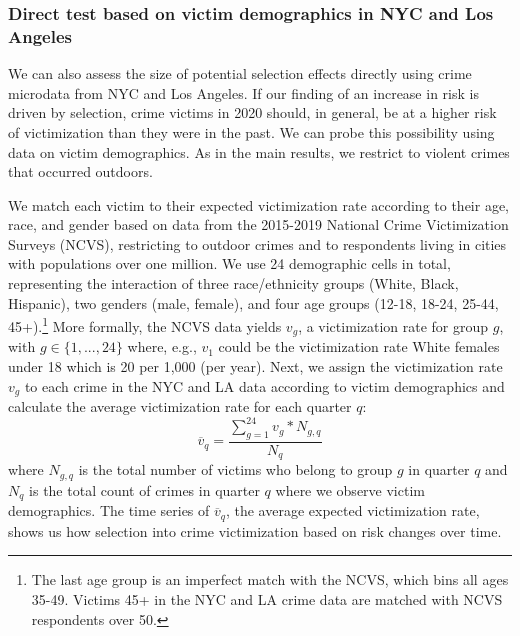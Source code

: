 \newpage 
\subsubsection{Direct test based on victim demographics in NYC and Los Angeles} \label{selection2}


We can also assess the size of potential selection effects directly using crime microdata from NYC and Los Angeles. If our finding of an increase in risk is driven by selection, crime victims in 2020 should, in general, be at a higher risk of victimization than they were in the past. We can probe this possibility using data on victim demographics. As in the main results, we restrict to violent crimes that occurred outdoors.

We match each victim to their expected victimization rate according to their age, race, and gender based on data from the 2015-2019 National Crime Victimization Surveys (NCVS), restricting to outdoor crimes and to respondents living in cities with populations over one million. We use 24 demographic cells in total, representing the interaction of three race/ethnicity groups (White, Black, Hispanic), two genders (male, female), and four age groups (12-18, 18-24, 25-44, 45+).\footnote{The last age group is an imperfect match with the NCVS, which bins all ages 35-49. Victims 45+ in the NYC and LA crime data are matched with NCVS respondents over 50.} More formally, the NCVS data yields $v_g$, a victimization rate for group $g$, with $g \in \{ 1,...,24\}$ where, e.g., $v_1$ could be the victimization rate White females under 18 which is 20 per 1,000 (per year). Next, we assign the victimization rate $v_g$ to each crime in the NYC and LA data according to victim demographics and calculate the average victimization rate for each quarter $q$:
\begin{equation}
\overline{v}_q = \frac{ \sum_{g=1}^{24} v_g * N_{g,q}}{N_q}
\end{equation}
where  $N_{g,q}$ is the total number of victims who belong to group $g$ in quarter $q$ and $N_q$ is the total count of crimes in quarter $q$ where we observe victim demographics. The time series of $\overline{v}_q$, the average expected victimization rate, shows us how selection into crime victimization based on risk changes over time.

